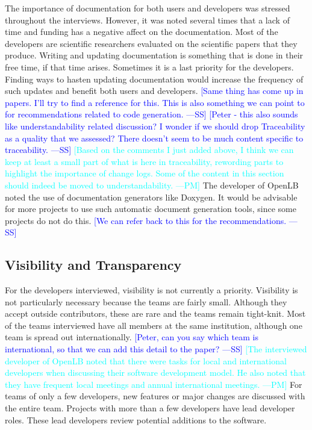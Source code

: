 \documentclass[final, 3p, times, authoryear]{elsarticle}
\newcommand{\authornote}[3]{\textcolor{#1}{[#3 ---#2]}}
\newcommand{\authornote}[3]{}
\newcommand{\wss}[1]{\authornote{blue}{SS}{#1}} %
\newcommand{\pmm}[1]{\authornote{cyan}{PM}{#1}} %
\begin{document}
The importance of documentation for both users and developers was stressed
throughout the interviews. However, it was noted several times that a lack of
time and funding has a negative affect on the documentation. Most of the
developers are scientific researchers evaluated on the scientific papers that
they produce. Writing and updating documentation is something that is done in
their free time, if that time arises. Sometimes it is a last priority for the
developers. Finding ways to hasten updating documentation would increase the
frequency of such updates and benefit both users and developers.  \wss{Same
thing has come up in papers.  I'll try to find a reference for this.  This is
also something we can point to for recommendations related to code generation.}
\wss{Peter - this also sounds like understandability related discussion?  I
wonder if we should drop Traceability as a quality that we assessed?  There
doesn't seem to be much content specific to traceability.}  \pmm{Based on the
comments I just added above, I think we can keep at least a small part of what
is here in traceability, rewording parts to highlight the importance of change
logs. Some of the content in this section should indeed be moved to
understandability.} The developer of OpenLB noted the use of documentation
generators like Doxygen. It would be advisable for more projects to use such
automatic document generation tools, since some projects do not do this.
\wss{We can refer back to this for the recommendations.}

\subsection{Visibility and Transparency} \label{secVisib}

For the developers interviewed, visibility is not currently a priority.
Visibility is not particularly necessary because the teams are fairly small.
Although they accept outside contributors, these are rare and the teams remain
tight-knit.  Most of the teams interviewed have all members at the same
institution, although one team is spread out internationally. \wss{Peter, can
you say which team is international, so that we can add this detail to the
paper?} \pmm{The interviewed developer of OpenLB noted that there were tasks for
local and international developers when discussing their software development
model. He also noted that they have frequent local meetings and annual
international meetings.}  For teams of only a few developers, new features or
major changes are discussed with the entire team. Projects with more than a few
developers have lead developer roles. These lead developers review potential
additions to the software.  
\end{document}
